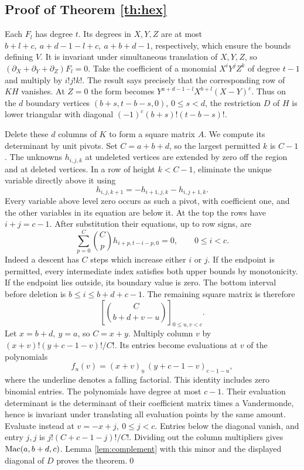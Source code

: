 \documentclass[11pt,letterpaper]{article}
\newcommand{\Mac}{\mathop{\rm Mac}}
\begin{document}
\clearpage
\subsection*{Proof of Theorem \ref{th:hex}}
Each \(F_l\) has degree \(t\). Its degrees in \(X,Y,Z\) are at most \(b+l+c,\ a+d-1-l+c,\ a+b+d-1\), respectively, which ensure the bounds defining \(V\). It is invariant under simultaneous translation of \(X,Y,Z\), so \((\partial_X+\partial_Y+\partial_Z)F_l=0\). Take the coefficient of a monomial \(X^iY^jZ^k\) of degree \(t-1\) and multiply by \(i!j!k!\). The result says precisely that the corresponding row of \(KH\) vanishes. At \(Z=0\) the form becomes \(Y^{a+d-1-l}X^{b+l}(X-Y)^c\). Thus on the \(d\) boundary vertices \((b+s,t-b-s,0)\), \(0\le s<d\), the restriction \(D\) of \(H\) is lower triangular with diagonal \((-1)^c(b+s)!(t-b-s)!\).

Delete these \(d\) columns of \(K\) to form a square matrix \(A\). We compute its determinant by unit pivots. Set \(C=a+b+d\), so the largest permitted \(k\) is \(C-1\). The unknowns \(h_{i,j,k}\) at undeleted vertices are extended by zero off the region and at deleted vertices. In a row of height \(k<C-1\), eliminate the unique variable directly above it using
\[
 h_{i,j,k+1}=-h_{i+1,j,k}-h_{i,j+1,k}.
\]
Every variable above level zero occurs as such a pivot, with coefficient one, and the other variables in its equation are below it. At the top the rows have \(i+j=c-1\). After substitution their equations, up to row signs, are
\[
 \sum_{p=0}^{C}\binom Cp h_{i+p,t-i-p,0}=0,\qquad 0\le i<c.
\]
Indeed a descent has \(C\) steps which increase either \(i\) or \(j\). If the endpoint is permitted, every intermediate index satisfies both upper bounds by monotonicity. If the endpoint lies outside, its boundary value is zero. The bottom interval before deletion is \(b\le i\le b+d+c-1\). The remaining square matrix is therefore
\[
 \left[\binom{C}{b+d+v-u}\right]_{0\le u,v<c}.
\]
Let \(x=b+d,\ y=a\), so \(C=x+y\). Multiply column \(v\) by \((x+v)!(y+c-1-v)!/C!\). Its entries become evaluations at \(v\) of the polynomials
\[
 f_u(v)=(x+v)_{\underline u}\,(y+c-1-v)_{\underline{c-1-u}},
\]
where the underline denotes a falling factorial. This identity includes zero binomial entries. The polynomials have degree at most \(c-1\). Their evaluation determinant is the determinant of their coefficient matrix times a Vandermonde, hence is invariant under translating all evaluation points by the same amount. Evaluate instead at \(v=-x+j,\ 0\le j<c\). Entries below the diagonal vanish, and entry \(j,j\) is \(j!(C+c-1-j)!/C!\). Dividing out the column multipliers gives \(\Mac(a,b+d,c)\). Lemma \ref{lem:complement} with this minor and the displayed diagonal of \(D\) proves the theorem.\qed
\end{document}
